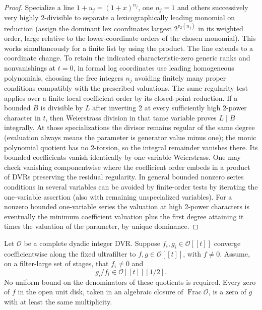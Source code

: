 \begin{proof}
Specialize a line \(1+u_j=(1+x)^{n_j}\), one \(n_j=1\) and others successively very highly 2-divisible to separate a lexicographically leading monomial on reduction (assign the dominant lex coordinates largest \(2^{v_2(n_j)}\) in its weighted order, large relative to the lower-coordinate orders of the chosen monomial). This works simultaneously for a finite list by using the product. The line extends to a coordinate change. To retain the indicated characteristic-zero generic ranks and nonvanishings at \(t=0\), in formal log coordinates use leading homogeneous polynomials, choosing the free integers \(n_j\) avoiding finitely many proper conditions compatibly with the prescribed valuations. The same regularity test applies over a finite local coefficient order by its closed-point reduction. If a bounded \(B\) is divisible by \(L\) after inverting 2 at every sufficiently high \(2\)-power character in \(t\), then Weierstrass division in that tame variable proves \(L\mid B\) integrally. At those specializations the divisor remains regular of the same degree (evaluation always means the parameter is generator value minus one); the monic polynomial quotient has no 2-torsion, so the integral remainder vanishes there. Its bounded coefficients vanish identically by one-variable Weierstrass. One may check vanishing componentwise where the coefficient order embeds in a product of DVRs preserving the residual regularity. In general bounded nonzero series conditions in several variables can be avoided by finite-order tests by iterating the one-variable assertion (also with remaining unspecialized variables). For a nonzero bounded one-variable series the valuation at high 2-power characters is eventually the minimum coefficient valuation plus the first degree attaining it times the valuation of the parameter, by unique dominance.
\end{proof}

\begin{lemma}\label{lem:foundations-poles}
Let \(\mathcal O\) be a complete dyadic integer DVR. Suppose
\(f_i,g_i\in\mathcal O[[t]]\) converge coefficientwise along the fixed
ultrafilter to \(f,g\in\mathcal O[[t]]\), with \(f\ne0\). Assume, on a
filter-large set of stages, that \(f_i\ne0\) and
\[
                         g_i/f_i\in\mathcal O[[t]][1/2].
\]
No uniform bound on the denominators of these quotients is required.
Every zero of \(f\) in the open unit disk, taken in an algebraic closure
of \(\operatorname{Frac}\mathcal O\), is a zero of \(g\) with at least
the same multiplicity.
\end{lemma}

